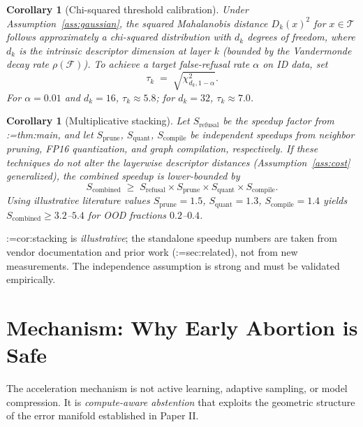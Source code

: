 \documentclass[11pt,a4paper]{article}
\makeatletter
\newcommand{\cref}[1]{\begingroup\def\crefsep{}\@for\crefitem:=#1\do{\crefsep\ref{\crefitem}\def\crefsep{, }}\endgroup}
\newcommand{\Cref}[1]{\cref{#1}}
\newtheorem{corollary}[theorem]{Corollary}
\makeatother
\begin{document}
\begin{corollary}[Chi-squared threshold calibration]\label{cor:chi2}
    Under Assumption~\ref{ass:gaussian}, the squared Mahalanobis distance $D_k(x)^2$ for $x\in\mathcal{T}$ follows approximately a chi-squared distribution with $d_k$ degrees of freedom, where $d_k$ is the intrinsic descriptor dimension at layer $k$ (bounded by the Vandermonde decay rate $\rho(\mathcal{F})$). To achieve a target false-refusal rate $\alpha$ on ID data, set
    \begin{equation}\label{eq:threshold}
        \tau_k \;=\; \sqrt{\chi^2_{d_k,1-\alpha}}.
    \end{equation}
    For $\alpha=0.01$ and $d_k=16$, $\tau_k\approx 5.8$; for $d_k=32$, $\tau_k\approx 7.0$.
\end{corollary}

\begin{corollary}[Multiplicative stacking]\label{cor:stacking}
    Let $S_{\text{refusal}}$ be the speedup factor from \cref{thm:main}, and let $S_{\text{prune}}$, $S_{\text{quant}}$, $S_{\text{compile}}$ be independent speedups from neighbor pruning, FP16 quantization, and graph compilation, respectively. If these techniques do not alter the layerwise descriptor distances (Assumption~\ref{ass:cost} generalized), the combined speedup is lower-bounded by
    \begin{equation}\label{eq:stacking}
        S_{\text{combined}} \;\ge\; S_{\text{refusal}} \times S_{\text{prune}} \times S_{\text{quant}} \times S_{\text{compile}}.
    \end{equation}
    Using illustrative literature values $S_{\text{prune}}=1.5$, $S_{\text{quant}}=1.3$, $S_{\text{compile}}=1.4$ yields $S_{\text{combined}}\ge 3.2$--$5.4$ for OOD fractions $0.2$--$0.4$.
\end{corollary}

\Cref{cor:stacking} is \emph{illustrative}; the standalone speedup numbers are taken from vendor documentation and prior work (\cref{sec:related}), not from new measurements. The independence assumption is strong and must be validated empirically.

\section{Mechanism: Why Early Abortion is Safe}\label{sec:mechanism}

The acceleration mechanism is not active learning, adaptive sampling, or model compression. It is \emph{compute-aware abstention} that exploits the geometric structure of the error manifold established in Paper II.
\end{document}
